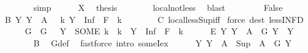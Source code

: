 \begin{isabellebody}
\ \ \ \ \ \ \isamarkupfalse%
\ simp\isanewline
\isanewline
\ \ \ \ \isamarkupfalse%
\ X\ \isamarkupfalse%
\ {\isacharquery}{\kern0pt}thesis\isanewline
\ \ \ \ \ \ \isamarkupfalse%
\ local{\isachardot}{\kern0pt}not{\isacharunderscore}{\kern0pt}less\ \isamarkupfalse%
\ blast\isanewline
\ \ \isamarkupfalse%
\isanewline
\ \ \ \ \isamarkupfalse%
\ False\isanewline
\ \ \ \ \isamarkupfalse%
\ B{\isacharcolon}{\kern0pt}\ {\isachardoublequoteopen}{\isasymAnd}Y{\isachardot}{\kern0pt}\ Y\ {\isasymin}\ A\ {\isasymLongrightarrow}\ {\isasymexists}\ k\ {\isasymin}Y\ {\isachardot}{\kern0pt}\ {\isasymSqunion}{\isacharparenleft}{\kern0pt}Inf\ {\isacharbackquote}{\kern0pt}\ {\isacharquery}{\kern0pt}F{\isacharparenright}{\kern0pt}\ {\isacharless}{\kern0pt}\ k{\isachardoublequoteclose}\isanewline
\ \ \ \ \ \ \isamarkupfalse%
\ C\ local{\isachardot}{\kern0pt}less{\isacharunderscore}{\kern0pt}Sup{\isacharunderscore}{\kern0pt}iff\ \isamarkupfalse%
{\isacharparenleft}{\kern0pt}force\ dest{\isacharcolon}{\kern0pt}\ less{\isacharunderscore}{\kern0pt}INF{\isacharunderscore}{\kern0pt}D{\isacharparenright}{\kern0pt}\isanewline
\ \ \ \ \isamarkupfalse%
\ G\ \ {\isachardoublequoteopen}G\ {\isasymequiv}\ {\isasymlambda}\ Y\ {\isachardot}{\kern0pt}\ SOME\ k\ {\isachardot}{\kern0pt}\ k\ {\isasymin}\ Y\ {\isasymand}\ {\isasymSqunion}{\isacharparenleft}{\kern0pt}Inf\ {\isacharbackquote}{\kern0pt}\ {\isacharquery}{\kern0pt}F{\isacharparenright}{\kern0pt}\ {\isacharless}{\kern0pt}\ k{\isachardoublequoteclose}\isanewline
\ \ \ \ \isamarkupfalse%
\ E{\isacharcolon}{\kern0pt}\ {\isachardoublequoteopen}{\isasymAnd}Y{\isachardot}{\kern0pt}\ Y\ {\isasymin}\ A\ {\isasymLongrightarrow}\ G\ Y\ {\isasymin}\ Y{\isachardoublequoteclose}\isanewline
\ \ \ \ \ \ \isamarkupfalse%
\ B\ \isamarkupfalse%
\ G{\isacharunderscore}{\kern0pt}def\ \isamarkupfalse%
\ {\isacharparenleft}{\kern0pt}fastforce\ intro{\isacharcolon}{\kern0pt}\ someI{}{\isacharunderscore}{\kern0pt}ex{\isacharparenright}{\kern0pt}\isanewline
\ \ \ \ \isamarkupfalse%
\ {\isachardoublequoteopen}{\isasymAnd}Y{\isachardot}{\kern0pt}\ Y\ {\isasymin}\ A\ {\isasymLongrightarrow}\ {\isasymSqinter}{\isacharparenleft}{\kern0pt}Sup\ {\isacharbackquote}{\kern0pt}\ A{\isacharparenright}{\kern0pt}\ {\isasymle}\ G\ Y{\isachardoublequoteclose}\isanewline
\ \ \ \ \ \ \isamarkupfalse%

\end{isabellebody}
